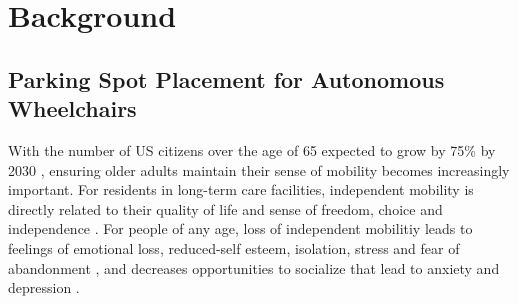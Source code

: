 \chapter{Background}
\label{ch:background}

\section{Parking Spot Placement for Autonomous Wheelchairs}

With the number of US citizens over the age of 65 expected to grow by 75\% by
2030 \cite{simpson2008many}, ensuring older adults maintain their sense of
mobility becomes increasingly important.
For residents in long-term care facilities, independent mobility is directly
related to their quality of life and sense of freedom, choice and independence
\cite{bourret2002meaning}.
For people of any age, loss of independent mobilitiy leads to feelings of
emotional loss, reduced-self esteem, isolation, stress and fear of abandonment
\cite{finlayson2003experiencing}, and decreases opportunities to socialize that
lead to anxiety and depression \cite{iezzoni2001mobility}. 

